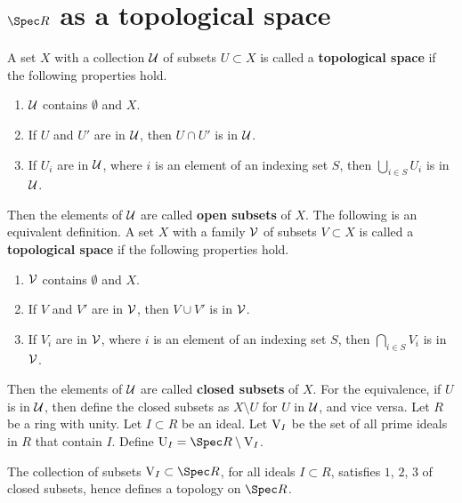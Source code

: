 \pagebreak

\section{\texorpdfstring{$ \Spec R $}{Spec R} as a topological space}


A set $ X $ with a collection $ \mathcal{U} $ of subsets $ U \subset X $ is called a \textbf{topological space} if the following properties hold.
\begin{enumerate}
\item $ \mathcal{U} $ contains $ \emptyset $ and $ X $.
\item If $ U $ and $ U' $ are in $ \mathcal{U} $, then $ U \cap U' $ is in $ \mathcal{U} $.
\item If $ U_i $ are in $ \mathcal{U} $, where $ i $ is an element of an indexing set $ S $, then $ \bigcup_{i \in S} U_i $ is in $ \mathcal{U} $.
\end{enumerate}
Then the elements of $ \mathcal{U} $ are called \textbf{open subsets} of $ X $. The following is an equivalent definition. A set $ X $ with a family $ \mathcal{V} $ of subsets $ V \subset X $ is called a \textbf{topological space} if the following properties hold.
\begin{enumerate}
\item $ \mathcal{V} $ contains $ \emptyset $ and $ X $.
\item If $ V $ and $ V' $ are in $ \mathcal{V} $, then $ V \cup V' $ is in $ \mathcal{V} $.
\item If $ V_i $ are in $ \mathcal{V} $, where $ i $ is an element of an indexing set $ S $, then $ \bigcap_{i \in S} V_i $ is in $ \mathcal{V} $.
\end{enumerate}
Then the elements of $ \mathcal{U} $ are called \textbf{closed subsets} of $ X $. For the equivalence, if $ U $ is in $ \mathcal{U} $, then define the closed subsets as $ X \setminus U $ for $ U $ in $ \mathcal{U} $, and vice versa. Let $ R $ be a ring with unity. Let $ I \subset R $ be an ideal. Let $ \mathrm{V}_I $ be the set of all prime ideals in $ R $ that contain $ I $. Define $ \U_I = \Spec R \setminus \V_I $.

\begin{proposition}
The collection of subsets $ \V_I \subset \Spec R $, for all ideals $ I \subset R $, satisfies $ 1 $, $ 2 $, $ 3 $ of closed subsets, hence defines a topology on $ \Spec R $.
\end{proposition}

